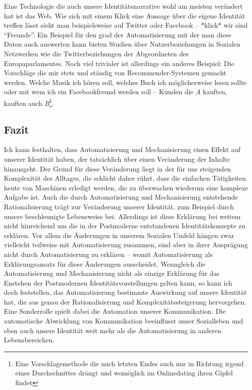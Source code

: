Eine Technologie die auch unsere Identitätsnarrative wohl am meisten verändert hat ist das Web.
Wie sich mit einem Klick eine Aussage über die eigene Identität treffen lässt sieht man beispielsweise auf Twitter oder Facebook – *klick* wir sind \enquote{Freunde}.
Ein Beispiel für den grad der Automatisierung mit der man diese Daten auch auswerten kann bieten Studien über Nutzerbeziehungen in Sozialen Netzwerken wie die Twitterbeziehungen der Abgeordneten des Europaparlamentes\parencite{maireder}.
Noch viel trivialer ist allerdings ein anderes Beispiel: Die Vorschläge die mir stets und ständig von Recommender-Systemen gemacht werden.
Welche Musik ich hören soll, welches Buch ich möglicherweise lesen sollte oder mit wem ich ein Facebookfreund werden soll – Kunden die \emph{A} kauften, kauften auch \emph{B}\footnote{Eine Vorschlagemethode die mich letzten Endes auch nur in Richtung irgend eines Durchschnittes drängt und womöglich im Onlinedating ihren Gipfel findet}.


\subsection {Fazit}

Ich kann festhalten, dass Automatisierung und Mechanisierung einen Effekt auf unserer Identität haben, der tatsächlich über einen Veränderung der Inhalte hinausgeht.
Der Grund für diese Veränderung liegt in der für uns steigenden Komplexität des Alltages, die schlicht daher rührt, dass die einfachen Tätigkeiten heute von Maschinen erledigt werden, die zu überwachen wiederum eine komplexe Aufgabe ist.
Auch die durch Automatisierung und Mechanisierung entstehende Rationalisierung trägt zur Veränderung unserer Identität, zum Beispiel durch unsere beschleunigte Lebensweise bei.
Allerdings ist diese Erklärung bei weitem nicht hinreichend um die in der Postmoderne entstandenen Identitätskonzepte zu erklären.
Vor allem die Änderungen in unserem Sozialen Umfeld hängen zwar vielleicht teilweise mit Automatisierung zusammen, sind aber in ihrer Ausprägung nicht durch Automatisierung zu erklären – womit Automatisierung als Erklärungsansatz für diese Änderungen ausscheidet.
Wenngleich die Automatisierung und Mechanisierung nicht als einzige Erklärung für das Enstehen der Postmodernen Identitätsvorstellungen gelten kann, so kann ich doch feststellen, das Automatisierung bestimmte Auswirkung auf unsere Identität hat, die aus genau der Rationalisierung und Komplexitätssteigerung hervorgehen.
Eine Sonderrolle spielt dabei die Automation unserer Kommunikation.
Die automatische Abwicklung von Kommunikation beeinflusst unser Sozialleben und eben auch unsere Identität weit mehr als die Automatisierung in anderen Lebensbereichen.
